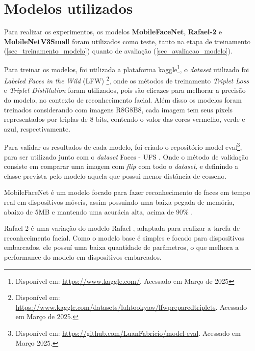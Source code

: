 \section{Modelos utilizados}\label{sec_modelo_utilizado}
Para realizar os experimentos, os modelos \textbf{MobileFaceNet}, \textbf{Rafael-2} e \textbf{MobileNetV3Small}
foram utilizados como teste, tanto na etapa de treinamento (\autoref{sec_treinamento_modelo}) quanto de avaliação
(\autoref{sec_avaliacao_modelo}).

Para treinar os modelos, foi utilizada a plataforma kaggle\footnote{
Disponível em: \url{https://www.kaggle.com/}. Acessado em Março de 2025}, o \textit{dataset} utilizado foi
\textit{Labeled Faces in the Wild} (LFW) \footnote{
Disponível em: \url{https://www.kaggle.com/datasets/luhtookyaw/lfwpreparedtriplets}. Acessado em Março de 2025.},
onde os métodos de treinamento \textit{Triplet Loss} e \textit{Triplet Distillation}
\cite{triplet_distillation_face_recognition} foram utilizados, pois são eficazes para melhorar a precisão do modelo,
no contexto de reconhecimento facial.
Além disso os modelos foram treinados considerando com imagens R8G8B8, cada imagem tem seus pixels representados por
triplas de 8 bits, contendo o valor das cores vermelho, verde e azul, respectivamente.

Para validar os resultados de cada modelo, foi criado o repositório model-eval\footnote{
Disponível em: \url{https://github.com/LuanFabricio/model-eval}. Acessado em Março 2025.}, para ser utilizado junto com o
\textit{dataset} Faces - UFS \cite{leandro}.
Onde o método de validação consiste em comparar uma imagem com \textit{flip} com todo o \textit{dataset}, e definindo
a classe prevista pelo modelo aquela que possui menor distância de cosseno.

MobileFaceNet é um modelo focado para fazer reconhecimento de faces em tempo real em dispositivos móveis,
assim possuindo uma baixa pegada de memória, abaixo de 5MB e mantendo uma acurácia alta, acima de 90\% \cite{leandro}.

Rafael-2 é uma variação do modelo Rafael \cite{rafael}, adaptada para realizar a tarefa de reconhecimento facial.
Como o modelo base é simples e focado para dispositivos embarcados, ele possuí uma baixa quantidade de parâmetros,
 o que melhora a performance do modelo em dispositivos embarcados.

